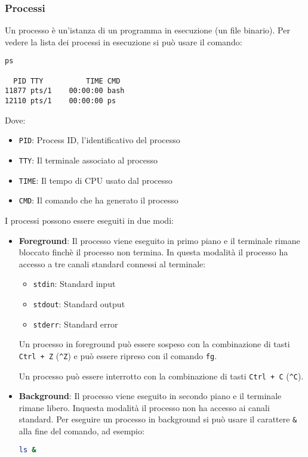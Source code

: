 \documentclass[a4paper]{article}
\begin{document}
\subsubsection{Processi}
Un processo è un'istanza di un programma in esecuzione (un file binario). Per vedere
la lista dei processi in esecuzione si può usare il comando:
\begin{lstlisting}
ps

  PID TTY          TIME CMD
11877 pts/1    00:00:00 bash
12110 pts/1    00:00:00 ps
\end{lstlisting}
Dove:
\begin{itemize}
  \item \texttt{PID}: Process ID, l'identificativo del processo
  \item \texttt{TTY}: Il terminale associato al processo
  \item \texttt{TIME}: Il tempo di CPU usato dal processo
  \item \texttt{CMD}: Il comando che ha generato il processo
\end{itemize}

\vspace{1em}
\noindent
I processi possono essere eseguiti in due modi:
\begin{itemize}
  \item \textbf{Foreground}: Il processo viene eseguito in primo piano e il terminale
    rimane bloccato finchè il processo non termina. In questa modalità il processo
    ha accesso a tre canali standard connessi al terminale:
    \begin{itemize}
      \item \texttt{stdin}: Standard input
      \item \texttt{stdout}: Standard output
      \item \texttt{stderr}: Standard error
    \end{itemize}
    Un processo in foreground può essere sospeso con la combinazione di tasti \texttt{Ctrl + Z}
    (\texttt{\textasciicircum Z}) e può essere ripreso con il comando \texttt{fg}.

    Un processo può essere interrotto con la combinazione di tasti \texttt{Ctrl + C} (\texttt{\textasciicircum C}).
  \item \textbf{Background}: Il processo viene eseguito in secondo piano e il terminale
    rimane libero. Inquesta modalità il processo non ha accesso ai canali standard.
    Per eseguire un processo in background si può usare il carattere \texttt{\&} alla
    fine del comando, ad esempio:
\begin{lstlisting}[language=bash]
ls &
\end{lstlisting}
\end{itemize}
\end{document}
